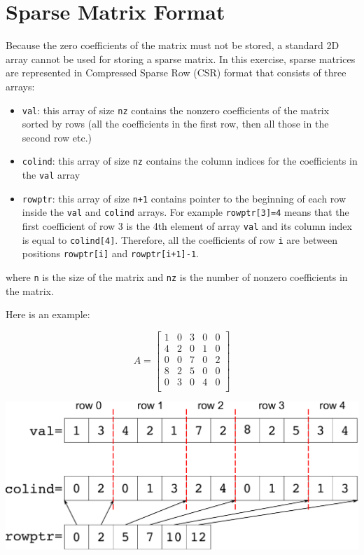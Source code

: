 \documentclass{article}
\begin{document}
\section{Sparse Matrix Format}

Because the zero coefficients of the matrix must not be stored, a
standard 2D array cannot be used for storing a sparse matrix. 
In this exercise, sparse matrices are represented in Compressed Sparse
Row (CSR) format that consists of three arrays:

\begin{itemize}
\item \texttt{val}: this array of size \texttt{nz} contains the
  nonzero coefficients of the matrix sorted by rows (all the
  coefficients in the first row, then all those in the second row
  etc.)
\item \texttt{colind}: this array of size \texttt{nz} contains the
  column indices for the coefficients in the \texttt{val} array
\item \texttt{rowptr}: this array of size \texttt{n+1} contains
  pointer to the beginning of each row inside the \texttt{val} and
  \texttt{colind} arrays. For example \texttt{rowptr[3]=4} means that
  the first coefficient of row 3 is the 4th element of array
  \texttt{val} and its column index is equal to
  \texttt{colind[4]}. Therefore, all the coefficients of row
  \texttt{i} are between positions \texttt{rowptr[i]} and
  \texttt{rowptr[i+1]-1}.
\end{itemize}
where \texttt{n} is the size of the matrix and \texttt{nz} is the number
of nonzero coefficients in the matrix.

Here is an example:

\vspace{0.5cm}

\begin{minipage}{0.4\linewidth}
\begin{displaymath}
   A=\left[\begin{array}{ccccc}
   1 & 0 & 3 & 0 & 0\\
   4 & 2 & 0 & 1 & 0\\
   0 & 0 & 7 & 0 & 2\\
   8 & 2 & 5 & 0 & 0\\
   0 & 3 & 0 & 4 & 0\\
  \end{array}\right]
\end{displaymath}
\end{minipage}%
\begin{minipage}{0.6\linewidth}
  \centering
  \includegraphics[width=\textwidth]{csr}
\end{minipage}
\end{document}
